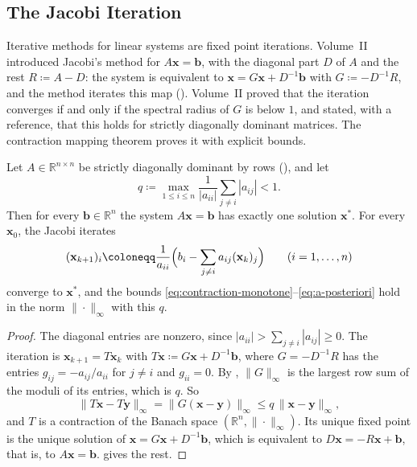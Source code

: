 \subsection{The Jacobi Iteration}

Iterative methods for linear systems are fixed point iterations. Volume~II introduced Jacobi's method for $A\mathbf x=\mathbf b$, with the diagonal part $D$ of $A$ and the rest $R\coloneqq A-D$: the system is equivalent to $\mathbf x=G\mathbf x+D^{-1}\mathbf b$ with $G\coloneqq-D^{-1}R$, and the method iterates this map (). Volume~II proved that the iteration converges if and only if the spectral radius of $G$ is below $1$, and stated, with a reference, that this holds for strictly diagonally dominant matrices. The contraction mapping theorem proves it with explicit bounds.

\begin{theorem}
\label{thm:jacobi-contraction}
Let $A\in\mathbb R^{n\times n}$ be strictly diagonally dominant by rows (), and let
\[
q\coloneqq\max_{1\le i\le n}\frac1{|a_{ii}|}\sum_{j\ne i}|a_{ij}|<1 .
\]
Then for every $\mathbf b\in\mathbb R^n$ the system $A\mathbf x=\mathbf b$ has exactly one solution $\mathbf x^*$. For every $\mathbf x_0$, the Jacobi iterates
\[
(\mathbf x_{k+1})_i\coloneqq\frac1{a_{ii}}\Bigl(b_i-\sum_{j\ne i}a_{ij}(\mathbf x_k)_j\Bigr)\qquad(i=1,\ldots,n)
\]
converge to $\mathbf x^*$, and the bounds \eqref{eq:contraction-monotone}--\eqref{eq:a-posteriori} hold in the norm $\|\cdot\|_\infty$ with this $q$.
\end{theorem}

\begin{proof}
The diagonal entries are nonzero, since $|a_{ii}|>\sum_{j\ne i}|a_{ij}|\ge0$. The iteration is $\mathbf x_{k+1}=T\mathbf x_k$ with $T\mathbf x\coloneqq G\mathbf x+D^{-1}\mathbf b$, where $G=-D^{-1}R$ has the entries $g_{ij}=-a_{ij}/a_{ii}$ for $j\ne i$ and $g_{ii}=0$. By , $\|G\|_\infty$ is the largest row sum of the moduli of its entries, which is $q$. So
\[
\|T\mathbf x-T\mathbf y\|_\infty=\|G(\mathbf x-\mathbf y)\|_\infty\le q\,\|\mathbf x-\mathbf y\|_\infty ,
\]
and $T$ is a contraction of the Banach space $(\mathbb R^n,\|\cdot\|_\infty)$. Its unique fixed point is the unique solution of $\mathbf x=G\mathbf x+D^{-1}\mathbf b$, which is equivalent to $D\mathbf x=-R\mathbf x+\mathbf b$, that is, to $A\mathbf x=\mathbf b$.  gives the rest.
\end{proof}

